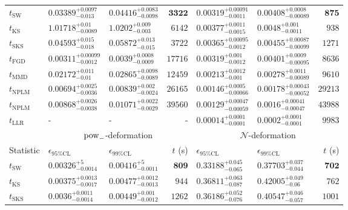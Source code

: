 \begin{tabular}{l|llr|llr}
	\midrule
	$t_{\mathrm{SW}}$ & $0.03389_{-0.013}^{+0.0097}$ & $0.04416_{-0.0098}^{+0.0083}$ & ${\mathbf{3322}}$ & $0.00319_{-0.0011}^{+0.00091}$ & $0.00408_{-0.00089}^{+0.0008}$ & ${\mathbf{875}}$ \\
	$t_{\overline{\mathrm{KS}}}$ & $1.01718_{-0.0089}^{+0.01}$ & $1.0202_{-0.003}^{+0.009}$ & $6142$ & $0.00377_{-0.0015}^{+0.0011}$ & $0.0048_{-0.0011}^{+0.001}$ & $938$ \\
	$t_{\mathrm{SKS}}$ & $0.04593_{-0.018}^{+0.015}$ & $0.05872_{-0.015}^{+0.013}$ & $3722$ & $0.00365_{-0.0012}^{+0.00095}$ & $0.00455_{-0.00099}^{+0.00087}$ & $1271$ \\
	$t_{\mathrm{FGD}}$ & ${\mathbf{0.00311_{-0.0012}^{+0.00099}}}$ & ${\mathbf{0.0039_{-0.0009}^{+0.0008}}}$ & $17716$ & $0.00319_{-0.0012}^{+0.001}$ & $0.00401_{-0.00095}^{+0.0009}$ & $8636$ \\
	$t_{\mathrm{MMD}}$ & $0.02172_{-0.01}^{+0.011}$ & $0.02865_{-0.0089}^{+0.0098}$ & $12459$ & ${\mathbf{0.00213_{-0.001}^{+0.0012}}}$ & ${\mathbf{0.00278_{-0.00089}^{+0.0011}}}$ & $9610$ \\
\rowcolor{red!35}	$t_{\mathrm{NPLM}}$ & $0.00694_{-0.0036}^{+0.0025}$ & $0.00839_{-0.0024}^{+0.002}$ & $26165$ & $0.00146_{-0.00066}^{+0.0005}$ & $0.00178_{-0.00052}^{+0.00043}$ & $29213$ \\
\rowcolor{blue!35}	$t_{\mathrm{NPLM}}$ & $0.00868_{-0.0038}^{+0.0026}$ & $0.01071_{-0.0029}^{+0.0022}$ & $39560$ & $0.00129_{-0.00059}^{+0.00047}$ & $0.0016_{-0.00047}^{+0.00041}$ & $43988$ \\
	$t_{\mathrm{LLR}}$ & - & - & - & $0.00014_{-0.0001}^{+0.0001}$ & $0.0002_{-0.0001}^{+0.0001}$ & $9983$ \\
	\toprule
	\multicolumn{1}{c}{} & \multicolumn{3}{c}{$\rm{pow}_{-}$-deformation} & \multicolumn{3}{c}{$\mathcal{N}$-deformation} \\
	Statistic & $\epsilon_{95\%\mathrm{CL}}$ & $\epsilon_{99\%\mathrm{CL}}$ & $t$ (s) & $\epsilon_{95\%\mathrm{CL}}$ & $\epsilon_{99\%\mathrm{CL}}$ & $t$ (s) \\
	\midrule
	$t_{\mathrm{SW}}$ & $0.00326_{-0.0014}^{+5}$ & $0.00416_{-0.0011}^{+5}$ & ${\mathbf{809}}$ & $0.33188_{-0.065}^{+0.045}$ & $0.37703_{-0.044}^{+0.037}$ & ${\mathbf{702}}$ \\
	$t_{\overline{\mathrm{KS}}}$ & $0.00375_{-0.0017}^{+0.0013}$ & $0.00477_{-0.0013}^{+0.0012}$ & $944$ & $0.36811_{-0.087}^{+0.063}$ & $0.42005_{-0.06}^{+0.049}$ & $762$ \\
	$t_{\mathrm{SKS}}$ & $0.0036_{-0.0014}^{+0.0011}$ & $0.00449_{-0.0012}^{+0.001}$ & $1262$ & $0.36186_{-0.076}^{+0.052}$ & $0.40547_{-0.057}^{+0.046}$ & $1001$ \\

\end{tabular}
